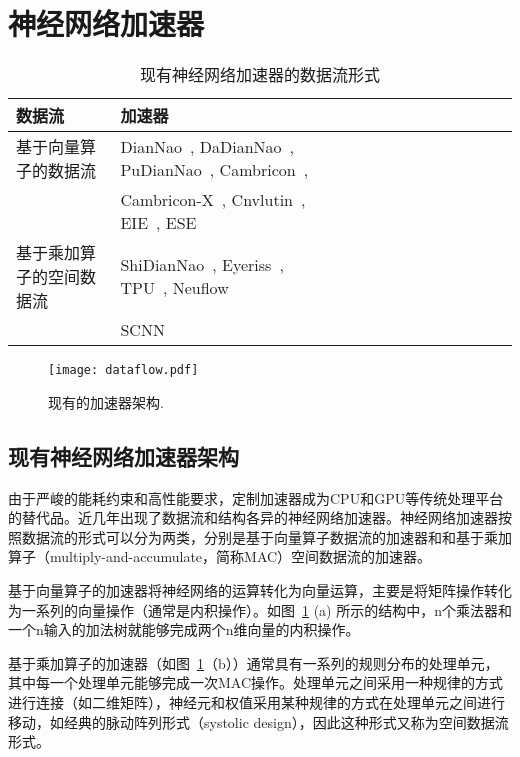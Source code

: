 \section{神经网络加速器}
\begin{table}[b]
  \footnotesize
  \centering
\caption{\footnotesize 现有神经网络加速器的数据流形式}
\label{tab:dataflow}
\begin{tabular}{@{}lllll@{}llllllll}
  \toprule
  数据流 & 加速器\\
  \midrule
  基于向量算子的数据流 & DianNao~\cite{chen2014diannao}, DaDianNao~\cite{chen2014dadiannao}, PuDianNao~\cite{liu2015pudiannao}, Cambricon~\cite{liu2016cambricon}, \\ 
  ~ & Cambricon-X~\cite{zhang2016cambricon}, Cnvlutin~\cite{albericio2016cnvlutin}, EIE~\cite{han2016eie}, ESE~\cite{han2017ese} \\
  基于乘加算子的空间数据流 & ShiDianNao~\cite{du2015shidiannao}, Eyeriss~\cite{chen2017eyeriss}, TPU~\cite{jouppi2017tpu}, Neuflow~\cite{farabet2011neuflow} \\
  ~& SCNN~\cite{angshuman2017scnn}  \\
\bottomrule
\end{tabular}
\end{table}

\begin{figure}[t]
  \centering
  \texttt{[image: dataflow.pdf]}
  \caption{\footnotesize 现有的加速器架构.}
  \label{fig:dataflow}
\end{figure}

\subsection{现有神经网络加速器架构}
由于严峻的能耗约束和高性能要求，定制加速器成为CPU和GPU等传统处理平台的替代品。近几年出现了数据流和结构各异的神经网络加速器。神经网络加速器按照数据流的形式可以分为两类，分别是基于向量算子数据流的加速器和和基于乘加算子（multiply-and-accumulate，简称MAC）空间数据流的加速器。

基于向量算子的加速器将神经网络的运算转化为向量运算，主要是将矩阵操作转化为一系列的向量操作（通常是内积操作）。如图~\ref{fig:dataflow} (a) 所示的结构中，n个乘法器和一个n输入的加法树就能够完成两个n维向量的内积操作。

基于乘加算子的加速器（如图~\ref{fig:dataflow}（b））通常具有一系列的规则分布的处理单元，其中每一个处理单元能够完成一次MAC操作。处理单元之间采用一种规律的方式进行连接（如二维矩阵），神经元和权值采用某种规律的方式在处理单元之间进行移动，如经典的脉动阵列形式（systolic design），因此这种形式又称为空间数据流形式。

